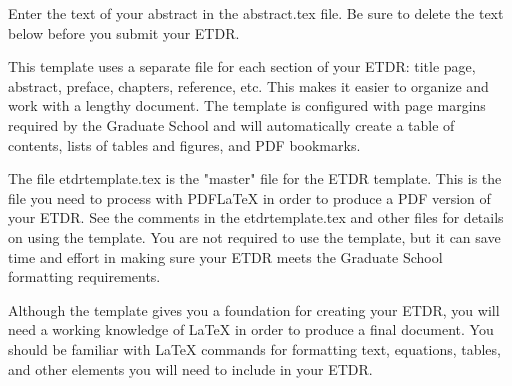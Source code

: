 
\pagestyle{empty}
\setlength{\baselineskip}{0.8cm}



Enter the text of your abstract in the abstract.tex file.  Be sure
to delete the text below before you submit your ETDR.

This template uses a separate file for each section of your ETDR:
title page, abstract, preface, chapters, reference, etc.  This
makes it easier to organize and work with a lengthy document.  The
template is configured with page margins required by the Graduate
School and will automatically create a table of contents, lists of
tables and figures, and PDF bookmarks.

The file etdrtemplate.tex is the "master" file for the ETDR
template.  This is the file you need to process with PDFLaTeX in
order to produce a PDF version of your ETDR.  See the comments in
the etdrtemplate.tex and other files for details on using the
template.  You are not required to use the template, but it can save
time and effort in making sure your ETDR meets the Graduate School
formatting requirements.

Although the template gives you a foundation for creating your
ETDR, you will need a working knowledge of LaTeX in order to
produce a final document.  You should be familiar with LaTeX
commands for formatting text, equations, tables, and other
elements you will need to include in your ETDR.
